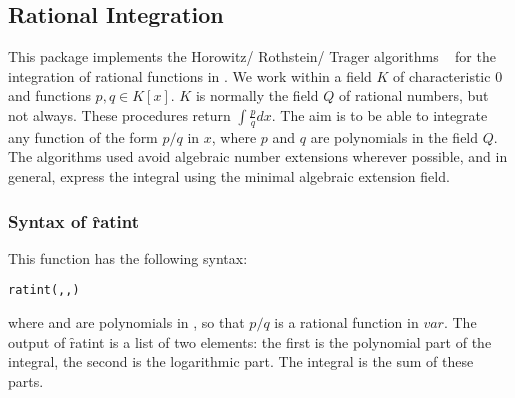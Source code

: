  

\subsection{Rational Integration}

This package implements the Horowitz/ Rothstein/ Trager algorithms ~\cite{Geddes:92} for the integration of rational functions in \REDUCE. We work within a field $K$ of characteristic $0$ and functions $p,q \in K[x]$. $K$ is normally the field $Q$ of rational numbers, but not always. These procedures return $\int \frac{p}{q} dx.$
 The aim is to be able to integrate any function of the form $p/q$ in $x$, where $p$ and $q$ are polynomials in the field $Q$. The algorithms used avoid algebraic number extensions wherever possible, and in general, express the integral using the minimal algebraic extension field.

 \subsubsection{Syntax of \f{ratint}}
 \hypertarget{operator:RATINT}{}
This function has the following syntax:
\begin{syntax}
  \texttt{ratint(,,)}
\end{syntax}
where  and  are polynomials in , so that $p/q$ is a rational function in $var$.
The output of \f{ratint} is a list of two elements: the first is the polynomial part of the integral, the second is the logarithmic part. The integral is the sum of these parts.
